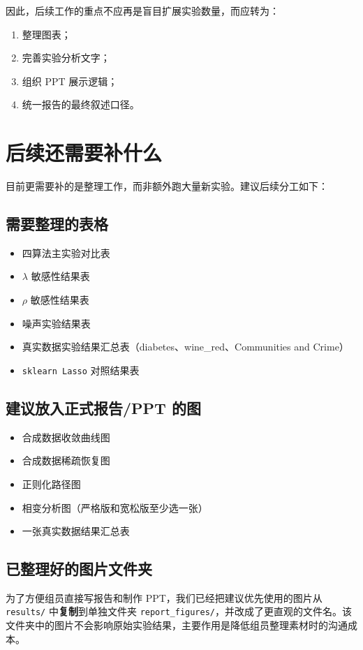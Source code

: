 \documentclass[12pt,a4paper]{ctexart}
\begin{document}
因此，后续工作的重点不应再是盲目扩展实验数量，而应转为：
\begin{enumerate}[label=\arabic*.]
    \item 整理图表；
    \item 完善实验分析文字；
    \item 组织 PPT 展示逻辑；
    \item 统一报告的最终叙述口径。
\end{enumerate}

\section{后续还需要补什么}
目前更需要补的是整理工作，而非额外跑大量新实验。建议后续分工如下：

\subsection{需要整理的表格}
\begin{itemize}[leftmargin=2em]
    \item 四算法主实验对比表
    \item $\lambda$ 敏感性结果表
    \item $\rho$ 敏感性结果表
    \item 噪声实验结果表
    \item 真实数据实验结果汇总表（diabetes、wine\_red、Communities and Crime）
    \item \texttt{sklearn Lasso} 对照结果表
\end{itemize}

\subsection{建议放入正式报告/PPT 的图}
\begin{itemize}[leftmargin=2em]
    \item 合成数据收敛曲线图
    \item 合成数据稀疏恢复图
    \item 正则化路径图
    \item 相变分析图（严格版和宽松版至少选一张）
    \item 一张真实数据结果汇总表
\end{itemize}

\subsection{已整理好的图片文件夹}
为了方便组员直接写报告和制作 PPT，我们已经把建议优先使用的图片从 \texttt{results/} 中\textbf{复制}到单独文件夹 \texttt{report\_figures/}，并改成了更直观的文件名。该文件夹中的图片不会影响原始实验结果，主要作用是降低组员整理素材时的沟通成本。
\end{document}
